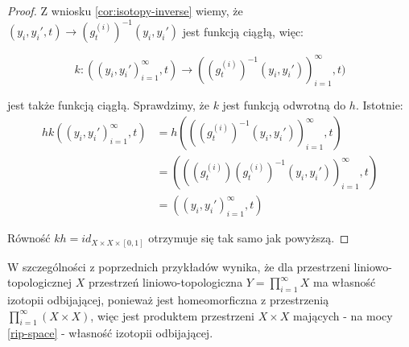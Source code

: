 \begin{ex}
\begin{proof}
    Z wniosku \ref{cor:isotopy-inverse} wiemy, że $(y_i, y_i', t) \rightarrow (g_t^{(i)})^{-1}(y_i, y_i')$ jest funkcją ciągłą, więc:
    
    \[
      k: ((y_i, y_i')_{i=1}^\infty, t) \rightarrow ((g_t^{(i)})^{-1}(y_i, y_i'))_{i=1}^\infty, t)
    \]
    
    jest także funkcją ciągłą. Sprawdzimy, że $k$ jest funkcją odwrotną do $h$. Istotnie:
    \begin{align*}
      hk((y_i, y_i')_{i=1}^\infty, t) &= h(((g_t^{(i)})^{-1}(y_i, y_i'))_{i=1}^\infty, t) \\
      &= (((g_t^{(i)})(g_t^{(i)})^{-1}(y_i, y_i'))_{i=1}^\infty, t) \\
      &= ((y_i, y_i')_{i=1}^\infty, t)
    \end{align*}
    
    Równość $kh = id_{X \times X \times [0,1]}$ otrzymuje się tak samo jak powyższą.

  \end{proof}
\end{ex}

\begin{ex}
  W szczególności z poprzednich przykładów wynika, że dla przestrzeni liniowo-topologicznej $X$ przestrzeń liniowo-topologiczna $Y = \prod_{i=1}^\infty X$ ma własność izotopii odbijającej, ponieważ jest homeomorficzna z przestrzenią $\prod_{i=1}^\infty (X \times X)$, więc jest produktem przestrzeni $X \times X$ mających - na mocy \ref{rip-space} - własność izotopii odbijającej.
\end{ex}


